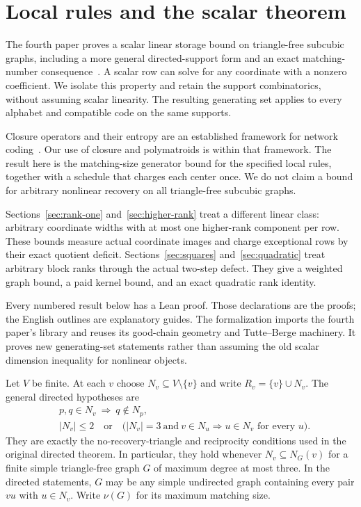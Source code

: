 \section{Local rules and the scalar theorem}\label{sec:intro}
The fourth paper proves a scalar linear storage bound on triangle-free
subcubic graphs, including a more general directed-support form and an
exact matching-number consequence~\cite{BrendeCurved}. A scalar row can
solve for any coordinate with a nonzero coefficient. We isolate this
property and retain the support combinatorics, without assuming scalar
linearity. The resulting generating set applies to every alphabet and
compatible code on the same supports.

Closure operators and their entropy are an established framework for
network coding~\cite{Gadouleau2014}. Our use of closure and polymatroids
is within that framework. The result here is the matching-size generator
bound for the specified local rules, together with a schedule that charges
each center once. We do not claim a bound for arbitrary nonlinear recovery
on all triangle-free subcubic graphs.

Sections~\ref{sec:rank-one} and~\ref{sec:higher-rank} treat a different
linear class: arbitrary coordinate widths with at most one higher-rank
component per row. These bounds measure actual coordinate images and
charge exceptional rows by their exact quotient deficit.
Sections~\ref{sec:squares} and~\ref{sec:quadratic} treat arbitrary block
ranks through the actual two-step defect. They give a weighted graph
bound, a paid kernel bound, and an exact quadratic rank identity.

Every numbered result below has a Lean proof. Those declarations are the
proofs; the English outlines are explanatory guides. The formalization
imports the fourth paper's library and reuses its good-chain geometry and
Tutte--Berge machinery. It proves new generating-set statements rather
than assuming the old scalar dimension inequality for nonlinear objects.

Let $V$ be finite. At each $v$ choose $N_v\subseteq V\setminus\{v\}$ and
write $R_v=\{v\}\cup N_v$. The general directed hypotheses are
\begin{align}
 &p,q\in N_v\ \Longrightarrow\ q\notin N_p,
   \label{eq:no-triangle}\\
 &|N_v|\le2\quad\text{or}\quad
   \bigl(|N_v|=3\ \text{and}\ v\in N_u\Longrightarrow u\in N_v
       \text{ for every }u\bigr).
   \label{eq:star}
\end{align}
They are exactly the no-recovery-triangle and reciprocity conditions used
in the original directed theorem. In particular, they hold whenever
$N_v\subseteq N_G(v)$ for a finite simple triangle-free graph $G$ of maximum
degree at most three. In the directed statements, $G$ may be any simple
undirected graph containing every pair $vu$ with $u\in N_v$.
Write $\nu(G)$ for its maximum matching size.

